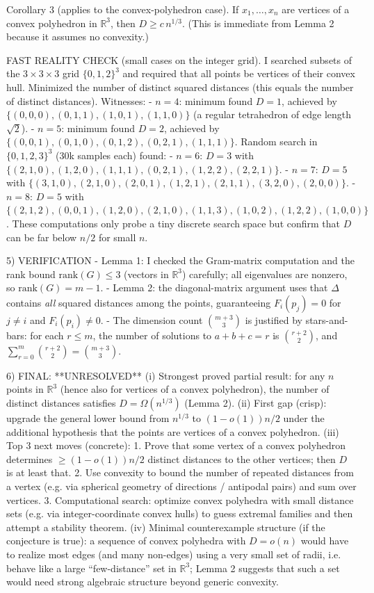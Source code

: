 Corollary 3 (applies to the convex-polyhedron case).
If $x_1,\ldots,x_n$ are vertices of a convex polyhedron in $\mathbb{R}^3$, then $D\ge c\,n^{1/3}$.
(This is immediate from Lemma 2 because it assumes no convexity.)

FAST REALITY CHECK (small cases on the integer grid).
I searched subsets of the $3\times 3\times 3$ grid $\{0,1,2\}^3$ and required that all points be vertices of their convex hull.
Minimized the number of distinct squared distances (this equals the number of distinct distances). Witnesses:
- $n=4$: minimum found $D=1$, achieved by $\{(0,0,0), (0,1,1), (1,0,1), (1,1,0)\}$ (a regular tetrahedron of edge length $\sqrt 2$).
- $n=5$: minimum found $D=2$, achieved by $\{(0,0,1), (0,1,0), (0,1,2), (0,2,1), (1,1,1)\}$. 
Random search in $\{0,1,2,3\}^3$ (30k samples each) found:
- $n=6$: $D=3$ with $\{(2,1,0), (1,2,0), (1,1,1), (0,2,1), (1,2,2), (2,2,1)\}$. 
- $n=7$: $D=5$ with $\{(3,1,0), (2,1,0), (2,0,1), (1,2,1), (2,1,1), (3,2,0), (2,0,0)\}$. 
- $n=8$: $D=5$ with $\{(2,1,2), (0,0,1), (1,2,0), (2,1,0), (1,1,3), (1,0,2), (1,2,2), (1,0,0)\}$. 
These computations only probe a tiny discrete search space but confirm that $D$ can be far below $n/2$ for small $n$.

5) VERIFICATION
- Lemma 1: I checked the Gram-matrix computation and the rank bound $\mathrm{rank}(G)\le 3$ (vectors in $\mathbb{R}^3$) carefully; all eigenvalues are nonzero, so $\mathrm{rank}(G)=m-1$.
- Lemma 2: the diagonal-matrix argument uses that $\Delta$ contains \emph{all} squared distances among the points, guaranteeing $F_i(p_j)=0$ for $j\neq i$ and $F_i(p_i)\neq 0$.
- The dimension count $\binom{m+3}{3}$ is justified by stars-and-bars: for each $r\le m$, the number of solutions to $a+b+c=r$ is $\binom{r+2}{2}$, and $\sum_{r=0}^m \binom{r+2}{2}=\binom{m+3}{3}$.

6) FINAL: **UNRESOLVED**
(i) Strongest proved partial result: for any $n$ points in $\mathbb{R}^3$ (hence also for vertices of a convex polyhedron), the number of distinct distances satisfies $D=\Omega(n^{1/3})$ (Lemma 2).
(ii) First gap (crisp): upgrade the general lower bound from $n^{1/3}$ to $(1-o(1))n/2$ under the additional hypothesis that the points are vertices of a convex polyhedron.
(iii) Top 3 next moves (concrete):
  1. Prove that some vertex of a convex polyhedron determines $\ge (1-o(1))n/2$ distinct distances to the other vertices; then $D$ is at least that.
  2. Use convexity to bound the number of repeated distances from a vertex (e.g. via spherical geometry of directions / antipodal pairs) and sum over vertices.
  3. Computational search: optimize convex polyhedra with small distance sets (e.g. via integer-coordinate convex hulls) to guess extremal families and then attempt a stability theorem.
(iv) Minimal counterexample structure (if the conjecture is true): a sequence of convex polyhedra with $D=o(n)$ would have to realize most edges (and many non-edges) using a very small set of radii, i.e. behave like a large ``few-distance'' set in $\mathbb{R}^3$; Lemma 2 suggests that such a set would need strong algebraic structure beyond generic convexity.
